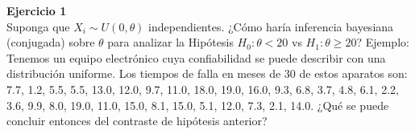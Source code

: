 \documentclass[a4paper, 11pt]{article}
\newenvironment{problem}[2][Ejercicio]
{ \begin{mdframed}[backgroundcolor= red!50] \textbf{#1 #2} \\}
	{  \end{mdframed}}
\begin{document}
	\setlength{\parskip}{\medskipamount}
	\setlength{\parindent}{0pt}
\begin{problem}{1} 
    Suponga que $X_i \sim U(0,\theta)$ independientes. ¿Cómo haría inferencia bayesiana (conjugada) sobre $\theta$ para analizar la Hipótesis $H_0: \theta < 20$ vs $H_1: \theta \geq 20$? Ejemplo: Tenemos un equipo electrónico cuya confiabilidad se puede describir con una distribución uniforme. Los tiempos de falla en meses de 30 de estos aparatos son: 7.7, 1.2, 5.5, 5.5, 13.0, 12.0, 9.7, 11.0, 18.0, 19.0, 16.0, 9.3, 6.8, 3.7, 4.8, 6.1, 2.2, 3.6, 9.9, 8.0, 19.0, 11.0, 15.0, 8.1, 15.0, 5.1, 12.0, 7.3, 2.1, 14.0. ¿Qué se puede concluir entonces del contraste de hipótesis anterior?    
\end{problem}
\end{document}
